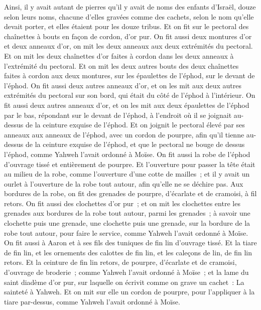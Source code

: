 \begin{multicols}{2}
Ainsi, il y avait autant de pierres qu'il y avait de noms des enfants d'Israël, douze selon leurs noms, chacune d'elles gravées comme des cachets, selon le nom qu'elle devait porter, et elles étaient pour les douze tribus.
Et on fit sur le pectoral des chaînettes à bouts en façon de cordon, d'or pur.
On fit aussi deux montures d'or et deux anneaux d'or, on mit les deux anneaux aux deux extrémités du pectoral.
Et on mit les deux chaînettes d'or faites à cordon dans les deux anneaux à l'extrémité du pectoral.
Et on mit les deux autres bouts des deux chaînettes faites à cordon aux deux montures, sur les épaulettes de l'éphod, sur le devant de l'éphod.
On fit aussi deux autres anneaux d'or, et on les mit aux deux autres extrémités du pectoral sur son bord, qui était du côté de l'éphod à l'intérieur.
On fit aussi deux autres anneaux d'or, et on les mit aux deux épaulettes de l'éphod par le bas, répondant sur le devant de l'éphod, à l'endroit où il se joignait au-dessus de la ceinture exquise de l'éphod.
Et on joignit le pectoral élevé par ses anneaux aux anneaux de l'éphod, avec un cordon de pourpre, afin qu'il tienne au-dessus de la ceinture exquise de l'éphod, et que le pectoral ne bouge de dessus l'éphod, comme Yahweh l'avait ordonné à Moïse.
On fit aussi la robe de l'éphod d'ouvrage tissé et entièrement de pourpre.
 Et l'ouverture pour passer la tête était au milieu de la robe, comme l'ouverture d'une cotte de mailles~; et il y avait un ourlet à l'ouverture de la robe tout autour, afin qu'elle ne se déchire pas.
Aux bordures de la robe, on fit des grenades de pourpre, d'écarlate et de cramoisi, à fil retors.
On fit aussi des clochettes d'or pur~; et on mit les clochettes entre les grenades aux bordures de la robe tout autour, parmi les grenades~;
à savoir une clochette puis une grenade, une clochette puis une grenade, sur la bordure de la robe tout autour, pour faire le service, comme Yahweh l'avait ordonné à Moïse.
On fit aussi à Aaron et à ses fils des tuniques de fin lin d'ouvrage tissé.
Et la tiare de fin lin, et les ornements des calottes de fin lin, et les caleçons de lin, de fin lin retors.
Et la ceinture de fin lin retors, de pourpre, d'écarlate et de cramoisi, d'ouvrage de broderie~; comme Yahweh l'avait ordonné à Moïse~;
et la lame du saint diadème d'or pur, sur laquelle on écrivit comme on grave un cachet~: La sainteté à Yahweh.
Et on mit sur elle un cordon de pourpre, pour l'appliquer à la tiare par-dessus, comme Yahweh l'avait ordonné à Moïse.

\end{multicols}
